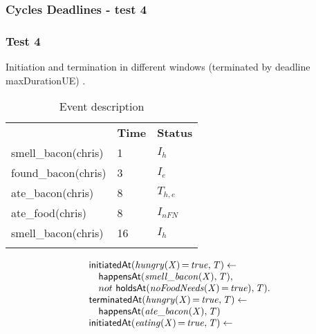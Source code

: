 \documentclass[8pt]{beamer}
\DeclareMathOperator{\val}{=}  %
\def \patsize {}
\def\happensAt{\textsf{\patsize happensAt}}
\def\holdsAt{\textsf{\patsize holdsAt}}
\def\initiatedAt{\textsf{\patsize initiatedAt}}
\def\terminatedAt{\textsf{\patsize terminatedAt}}
\newenvironment{mysplit}%
  {\arraycolsep 0pt \begin{array}{l}}%
  {\end{array}}
\begin{document}
\begin{frame}
    \frametitle{Cycles Deadlines - test 4}
    \subsubsection{Test 4}
    \small
    Initiation and termination in different windows (terminated by deadline maxDurationUE) .\linebreak
    \begin{minipage}{0.4\linewidth}
        \begin{table}[t!]
            \caption{Event description}
            \begin{center}

                \begin{tabular}{lll}
                    \hline\noalign{\smallskip}
                    \multicolumn{1}{l}{\textbf{Event}} & \multicolumn{1}{c}{\textbf{Time}} & \multicolumn{1}{c}{\textbf{Status}} \\
                    smell\_bacon(chris)& 1 & $I_{h}$\\
                    found\_bacon(chris)& 3 & $I_{e}$\\
                    ate\_bacon(chris)& 8  & $T_{h,e}$\\
                    ate\_food(chris)& 8  & $I_{nFN}$\\
                    smell\_bacon(chris)& 16 & $I_{h}$\\
                    \noalign{\smallskip}
                    \hline
                \end{tabular}
            \end{center}
        \end{table}
    \end{minipage}
    \begin{minipage}{0.55\linewidth}
        \begin{align*}
            \begin{mysplit}
                \initiatedAt\mathit{(hungry(X)\val true,T)\leftarrow}\\
                \quad    \happensAt\mathit{(smell\_bacon(X),T),}\\
                \quad    not\ \holdsAt\mathit{(noFoodNeeds(X)\val true),T).}\\
                \terminatedAt\mathit{(hungry(X)\val true,T)\leftarrow}\\
                \quad    \happensAt\mathit{(ate\_bacon(X),T)}\\
                \initiatedAt\mathit{(eating(X)\val true,T)\leftarrow}\\

\end{mysplit}
\end{align*}
\end{minipage}
\end{frame}
\end{document}
